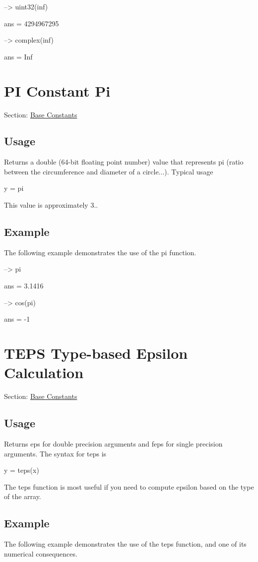\begin{DoxyVerbInclude}
--> uint32(inf)

ans = 
 4294967295 

--> complex(inf)

ans = 
 Inf 
\end{DoxyVerbInclude}
 \hypertarget{constants_pi}{}\section{P\-I Constant Pi}\label{constants_pi}
Section\-: \hyperlink{sec_constants}{Base Constants} \hypertarget{vtkwidgets_vtkxyplotwidget_Usage}{}\subsection{Usage}\label{vtkwidgets_vtkxyplotwidget_Usage}
Returns a {\ttfamily double} (64-\/bit floating point number) value that represents pi (ratio between the circumference and diameter of a circle...). Typical usage \begin{DoxyVerb}   y = pi
\end{DoxyVerb}
 This value is approximately 3.. \hypertarget{variables_struct_Example}{}\subsection{Example}\label{variables_struct_Example}
The following example demonstrates the use of the {\ttfamily pi} function.


\begin{DoxyVerbInclude}
--> pi

ans = 
    3.1416 

--> cos(pi)

ans = 
 -1 
\end{DoxyVerbInclude}
 \hypertarget{constants_teps}{}\section{T\-E\-P\-S Type-\/based Epsilon Calculation}\label{constants_teps}
Section\-: \hyperlink{sec_constants}{Base Constants} \hypertarget{vtkwidgets_vtkxyplotwidget_Usage}{}\subsection{Usage}\label{vtkwidgets_vtkxyplotwidget_Usage}
Returns {\ttfamily eps} for double precision arguments and {\ttfamily feps} for single precision arguments. The syntax for {\ttfamily teps} is \begin{DoxyVerb}   y = teps(x)
\end{DoxyVerb}
 The {\ttfamily teps} function is most useful if you need to compute epsilon based on the type of the array. \hypertarget{variables_struct_Example}{}\subsection{Example}\label{variables_struct_Example}
The following example demonstrates the use of the {\ttfamily teps} function, and one of its numerical consequences.


